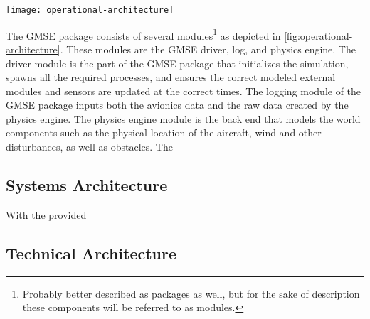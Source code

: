 \begin{figure*}[ht]
\texttt{[image: operational-architecture]}
\caption{}
\label{fig:operational-architecture}
\end{figure*}

The GMSE package consists of several modules\footnote{Probably better described as packages as well,
but for the sake of description these components will be referred to as modules.} as depicted in
\autoref{fig:operational-architecture}. These modules are the GMSE driver, log, and physics engine.
The driver module is the part of the GMSE package that initializes the simulation, spawns all the
required processes, and ensures the correct modeled external modules and sensors are updated at the
correct times. The logging module of the GMSE package inputs both the avionics data and the raw data
created by the physics engine. The physics engine module is the back end that models the world
components such as the physical location of the aircraft, wind and other disturbances, as well as
obstacles. The

\subsection{Systems Architecture}
\label{sec:systems-architecture}

With the provided

\subsection{Technical Architecture}
\label{sec:technical-architecture}


